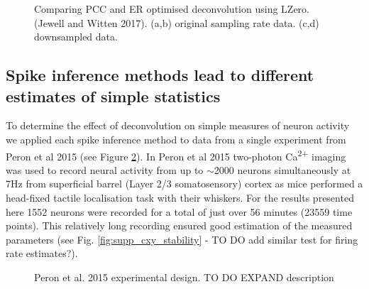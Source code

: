 \documentclass[a4paper]{article}
\begin{document}
\begin{figure}
\caption{\label{fig:deconv_metrics_LZero} Comparing PCC and ER optimised deconvolution using LZero.(Jewell and Witten 2017). (a,b) original sampling rate data. (c,d) downsampled data.}
\end{figure}

\clearpage
\subsection{Spike inference methods lead to different estimates of simple statistics}
To determine the effect of deconvolution on simple measures of neuron activity we applied each spike inference method to data from a single experiment from Peron et al 2015 (see Figure \ref{fig:peron_setup}). In Peron et al 2015 two-photon Ca\textsuperscript{2+} imaging was used to record neural activity from up to $\sim$2000 neurons simultaneously at 7Hz from superficial barrel (Layer 2/3 somatosensory) cortex as mice performed a head-fixed tactile localisation task with their whiskers. For the results presented here 1552 neurons were recorded for a total of just over 56 minutes (23559 time points). This relatively long recording ensured good estimation of the measured parameters (see Fig. \ref{fig:supp_cxy_stability} - TO DO add similar test for firing rate estimates?).




\begin{figure}[h!]
\centering
{}%
\caption{\label{fig:peron_setup} Peron et al. 2015 experimental design. TO DO EXPAND description}
\end{figure}
\end{document}
